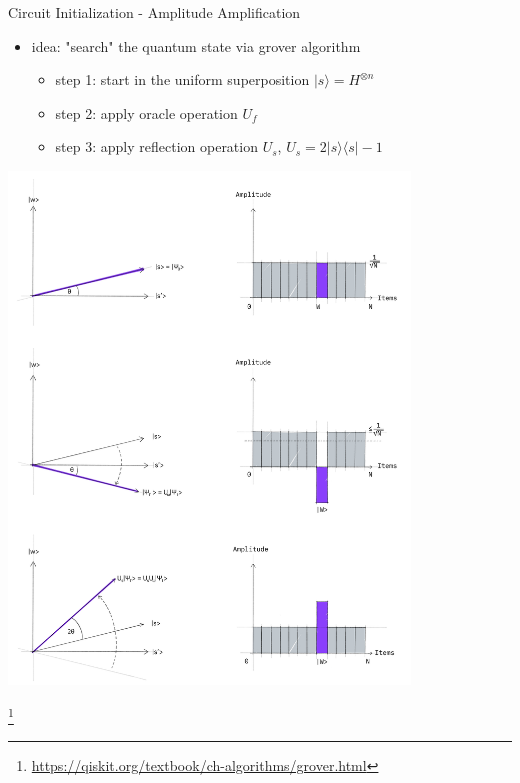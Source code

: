 \begin{frame}{Circuit Initialization - Amplitude Amplification}
  \begin{minipage}{0.5\textwidth}
    \begin{itemize}
      \item idea: "search" the quantum state via grover algorithm
      \begin{itemize}
        \item step 1: start in the uniform superposition $|s\rangle = H^{\otimes n}$
        \item step 2: apply oracle operation $U_f$
        \item step 3: apply reflection operation $U_s$, $U_s=2|s\rangle \langle s| -1$
      \end{itemize}
    \end{itemize}
  \end{minipage}%
  \hfill
  \begin{minipage}{0.5\textwidth}
    \centering
    \includegraphics[width=0.8\textwidth]{../assets/grover_steps.png}
  \end{minipage}
  \footnote{\url{https://qiskit.org/textbook/ch-algorithms/grover.html}}
\end{frame}


